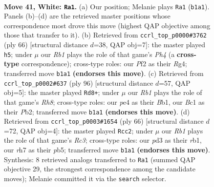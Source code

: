 \documentclass[11pt]{article}
\begin{document}
\clearpage

\begin{figure}[p]\centering
\begin{subfigure}{0.46\textwidth}\centering
\resizebox{\linewidth}{!}{%
\newchessgame
\chessboard[
  setfen={6k1/5prr/5n2/8/p3p2p/3p3P/PP3P1R/1RB1K3 w - - 22 41},
  showmover=false,
  pgfstyle=straightmove, color=movearrow, markmove={b1-a1}
]}
\caption{}
\end{subfigure}\hfill
\begin{subfigure}{0.46\textwidth}\centering
\resizebox{\linewidth}{!}{%
\newchessgame
\chessboard[
  setfen={3r4/3r2p1/2pk4/p3p3/P1n1P1RP/2P5/2K1R3/2B5 w - - 3 34},
  showmover=false,
  pgfstyle=straightmove, color=movearrow, markmove={h4-h5}
]}
\caption{}
\end{subfigure}
\\[4pt]
\begin{subfigure}{0.46\textwidth}\centering
\resizebox{\linewidth}{!}{%
\newchessgame
\chessboard[
  setfen={7R/p3r2p/1p1k2p1/3r1nP1/P5RP/8/KP6/1B6 w - - 25 49},
  showmover=false,
  pgfstyle=straightmove, color=movearrow, markmove={h8-d8}
]}
\caption{}
\end{subfigure}\hfill
\begin{subfigure}{0.46\textwidth}\centering
\resizebox{\linewidth}{!}{%
\newchessgame
\chessboard[
  setfen={5rk1/1N3ppn/4p2p/1p6/4PPP1/2RP3P/5RK1/1r6 w - - 6 34},
  showmover=false,
  pgfstyle=straightmove, color=movearrow, markmove={c3-c2}
]}
\caption{}
\end{subfigure}
\caption{\textbf{Move 41, White: \texttt{Ra1}.} (a) Our position; Melanie plays \texttt{Ra1} (\texttt{b1a1}). Panels (b)--(d) are the retrieved master positions whose correspondence most drove this move (highest QAP objective among those that transfer to it). (b) Retrieved from \texttt{ccrl\_top\_p0000\#3762} (ply 66) [structural distance $d$=38, QAP obj=7]: the master played \texttt{h5}; under $\mu$ our \emph{Rb1} plays the role of that game's \emph{Ph4} (a \textbf{cross-type} correspondence); cross-type roles: our \emph{P}f2 as their \emph{R}g4; transferred move \texttt{b1a1} \textbf{(endorses this move)}. (c) Retrieved from \texttt{ccrl\_top\_p0002\#637} (ply 96) [structural distance $d$=57, QAP obj=5]: the master played \texttt{Rd8+}; under $\mu$ our \emph{Rb1} plays the role of that game's \emph{Rh8}; cross-type roles: our \emph{p}e4 as their \emph{B}b1, our \emph{B}c1 as their \emph{P}b2; transferred move \texttt{b1a1} \textbf{(endorses this move)}. (d) Retrieved from \texttt{ccrl\_top\_p0003\#1654} (ply 66) [structural distance $d$=72, QAP obj=4]: the master played \texttt{Rcc2}; under $\mu$ our \emph{Rb1} plays the role of that game's \emph{Rc3}; cross-type roles: our \emph{p}d3 as their \emph{r}b1, our \emph{r}h7 as their \emph{p}b5; transferred move \texttt{b1a1} \textbf{(endorses this move)}. Synthesis: 8 retrieved analogs transferred to \texttt{Ra1} (summed QAP objective 29, the strongest correspondence among the candidate moves); Melanie committed it via the \texttt{search} selector.}
\label{fig:thought-m80}
\end{figure}
\end{document}
